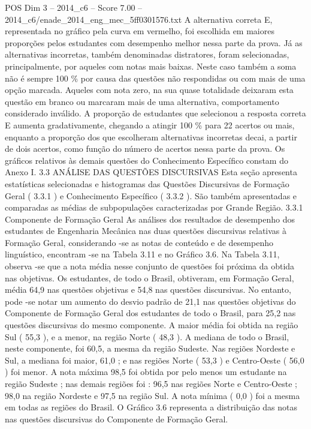 \begin{textsample}{POS Dim 3 – 2014\_c6 – Score 7.00 – 2014\_c6/enade\_2014\_eng\_mec\_5ff0301576.txt}
A alternativa correta E, representada no gráfico pela curva em vermelho, foi escolhida em maiores proporções pelos estudantes com desempenho melhor nessa parte da prova.
Já as alternativas incorretas, também denominadas distratores, foram selecionadas, principalmente, por aqueles com notas mais baixas.
Neste caso também a soma não é sempre 100 \% por causa das questões não respondidas ou com mais de uma opção marcada.
Aqueles com nota zero, na sua quase totalidade deixaram esta questão em branco ou marcaram mais de uma alternativa, comportamento considerado inválido.
A proporção de estudantes que selecionou a resposta correta E aumenta gradativamente, chegando a atingir 100 \% para 22 acertos ou mais, enquanto a proporção dos que escolheram alternativas incorretas decai, a partir de dois acertos, como função do número de acertos nessa parte da prova.
Os gráficos relativos às demais questões do Conhecimento Específico constam do Anexo I. 3.3 ANÁLISE DAS QUESTÕES DISCURSIVAS Esta seção apresenta estatísticas selecionadas e histogramas das Questões Discursivas de Formação Geral ( 3.3.1 ) e Conhecimento Específico ( 3.3.2 ).
São também apresentadas e comparadas as médias de subpopulações caracterizadas por Grande Região. 3.3.1 Componente de Formação Geral As análises dos resultados de desempenho dos estudantes de Engenharia Mecânica nas duas questões discursivas relativas à Formação Geral, considerando -se as notas de conteúdo e de desempenho linguístico, encontram -se na Tabela 3.11 e no Gráfico 3.6.
Na Tabela 3.11, observa -se que a nota média nesse conjunto de questões foi próxima da obtida nas objetivas.
Os estudantes, de todo o Brasil, obtiveram, em Formação Geral, média 64,9 nas questões objetivas e 54,8 nas questões discursivas.
No entanto, pode -se notar um aumento do desvio padrão de 21,1 nas questões objetivas do Componente de Formação Geral dos estudantes de todo o Brasil, para 25,2 nas questões discursivas do mesmo componente.
A maior média foi obtida na região Sul ( 55,3 ), e a menor, na região Norte ( 48,3 ).
A mediana de todo o Brasil, neste componente, foi 60,5, a mesma da região Sudeste.
Nas regiões Nordeste e Sul, a mediana foi maior, 61,0 ; e nas regiões Norte ( 53,3 ) e Centro-Oeste ( 56,0 ) foi menor.
A nota máxima 98,5 foi obtida por pelo menos um estudante na região Sudeste ; nas demais regiões foi : 96,5 nas regiões Norte e Centro-Oeste ; 98,0 na região Nordeste e 97,5 na região Sul.
A nota mínima ( 0,0 ) foi a mesma em todas as regiões do Brasil.
O Gráfico 3.6 representa a distribuição das notas nas questões discursivas do Componente de Formação Geral.

\end{textsample}
